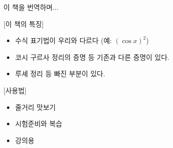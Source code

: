 이 책을 번역하며...


[이 책의 특징]
\begin{itemize}
\item 수식 표기법이 우리와 다르다 (예: $(\cos x)^2$)
\item 코시 구르사 정리의 증명 등 기존과 다른 증명이 있다.
\item 루셰 정리 등  빠진 부분이 있다.
\end{itemize}

[사용법]
\begin{itemize}
\item 줄거리 맛보기
\item 시험준비와 복습
\item 강의용
\end{itemize}



